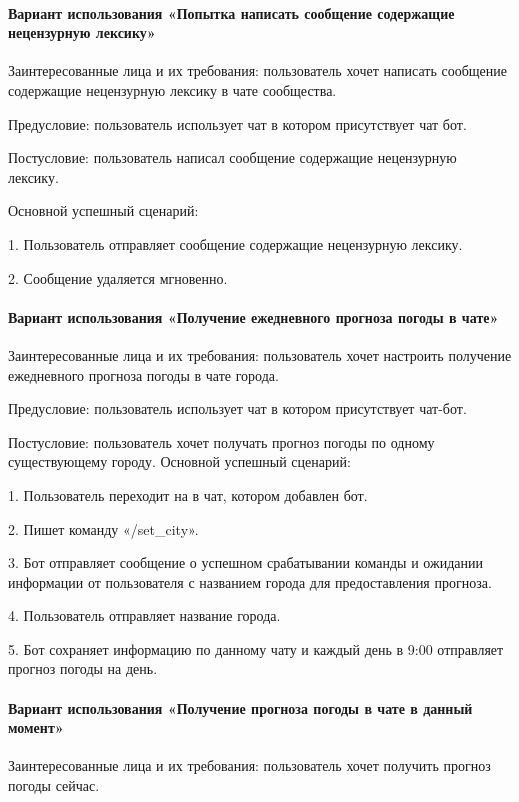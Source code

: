 \paragraph{Вариант использования «Попытка написать сообщение содержащие нецензурную лексику»}

Заинтересованные лица и их требования: пользователь хочет написать сообщение содержащие нецензурную лексику в чате сообщества.

Предусловие: пользователь использует чат в котором присутствует чат бот.

Постусловие: пользователь написал сообщение содержащие нецензурную лексику.
 
Основной успешный сценарий:

1.	Пользователь отправляет сообщение содержащие нецензурную лексику.

2.	Сообщение удаляется мгновенно.




\paragraph{Вариант использования «Получение ежедневного прогноза погоды в чате»}

Заинтересованные лица и их требования: пользователь хочет настроить получение ежедневного прогноза погоды в чате города.

Предусловие: пользователь использует чат в котором присутствует чат-бот.

Постусловие: пользователь хочет получать прогноз погоды по одному существующему городу.
Основной успешный сценарий:

1.	Пользователь переходит на в чат, котором добавлен бот.

2.	Пишет команду «/set\_city».

3.	Бот отправляет сообщение о успешном срабатывании команды и ожидании информации от пользователя с названием города для предоставления прогноза.

4.	Пользователь отправляет название города.

5.	Бот сохраняет информацию по данному чату и каждый день в 9:00 отправляет прогноз погоды на день.
\paragraph{Вариант использования «Получение прогноза погоды в чате в данный момент»}

Заинтересованные лица и их требования: пользователь хочет получить прогноз погоды сейчас.

